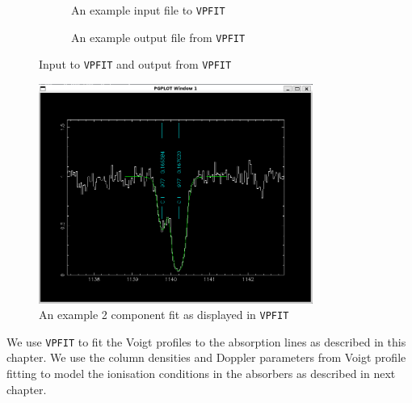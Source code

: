 \begin{figure}[!htbp]
    \centering
     \begin{subfigure}[t]{\textwidth}
         \centering
         {
            \setlength{\fboxsep}{0pt}
            \setlength{\fboxrule}{1pt}
}
         \caption{An example input file to {\tt VPFIT}}
         \label{fig:VPFIT-ip}
     \end{subfigure}

\medskip
\medskip
\medskip

    \begin{subfigure}[t]{\textwidth}
         \centering
         {
            \setlength{\fboxsep}{0pt}
            \setlength{\fboxrule}{1pt}
}
         \caption{An example output file from {\tt VPFIT}}
         \label{fig:VPFIT-op}
     \end{subfigure}
    \caption{Input to {\tt VPFIT} and output from {\tt VPFIT}}
    \label{fig:ip-op}
\end{figure}

\newpage

\begin{figure}[!t]
     \centering
     \includegraphics[width=0.8\textwidth]{Figures/VPFIT_fit.png}
     \caption{An example 2 component fit as displayed in {\tt VPFIT}}
     \label{fig:VPFIT-fit} 
\end{figure}

We use {\tt VPFIT} to fit the Voigt profiles to the absorption lines as described in this chapter. We use the column densities and Doppler parameters from Voigt profile fitting to model the ionisation conditions in the absorbers as described in next chapter.  
